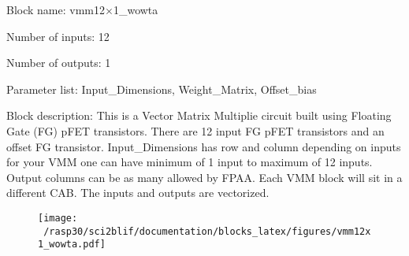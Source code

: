 \pagebreak
Block name: vmm12$\times$1\_wowta

Number of inputs: 12

Number of outputs: 1

Parameter list: Input\_Dimensions, Weight\_Matrix, Offset\_bias

Block description: 
This is a Vector Matrix Multiplie circuit built using Floating Gate (FG) pFET transistors. There are 12 input FG pFET transistors
and an offset FG transistor. Input\_Dimensions has row and column depending on inputs for your VMM one can have minimum of 1 input
to maximum of 12 inputs. Output columns can be as many allowed by FPAA. Each VMM block will sit in a different CAB. The inputs and
outputs are vectorized.

\begin{figure}[H]  %
\texttt{[image: ~/rasp30/sci2blif/documentation/blocks\_latex/figures/vmm12x1\_wowta.pdf]}
\end{figure}

